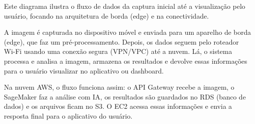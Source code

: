 \documentclass[
  a4paper,%
  12pt,%
  english,%
  brazilian,%
]{article}
\begin{document}
Este diagrama ilustra o fluxo de dados da captura inicial até a visualização pelo usuário, focando na arquitetura de borda (edge) e na conectividade.

A imagem é capturada no dispositivo móvel e enviada para um aparelho de borda (edge), que faz um pré-processamento. Depois, os dados seguem pelo roteador Wi-Fi usando uma conexão segura (VPN/VPC) até a nuvem. Lá, o sistema processa e analisa a imagem, armazena os resultados e devolve essas informações para o usuário visualizar no aplicativo ou dashboard.

Na nuvem AWS, o fluxo funciona assim: o API Gateway recebe a imagem, o SageMaker faz a análise com IA, os resultados são guardados no RDS (banco de dados) e os arquivos ficam no S3. O EC2 acessa essas informações e envia a resposta final para o aplicativo do usuário.
\end{document}
